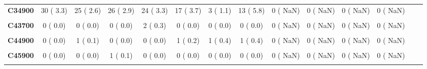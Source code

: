 \documentclass[
]{article}
\begin{document}
\begin{table}[H]
\begin{tabular}[t]{>{\raggedright\arraybackslash}p{5em}ccccccccccccc}
\textbf{C34900} & 30 (  3.3) & 25 (  2.6) & 26 (  2.9) & 24 (  3.3) & 17 (  3.7) & 3 (  1.1) & 13 (  5.8) & 0 (  NaN) & 0 (  NaN) & 0 (  NaN) & 0 (  NaN) &  & \\
\textbf{\cellcolor{gray!10}{C38400}} & \cellcolor{gray!10}{1 (  0.1)} & \cellcolor{gray!10}{0 (  0.0)} & \cellcolor{gray!10}{0 (  0.0)} & \cellcolor{gray!10}{0 (  0.0)} & \cellcolor{gray!10}{0 (  0.0)} & \cellcolor{gray!10}{0 (  0.0)} & \cellcolor{gray!10}{0 (  0.0)} & \cellcolor{gray!10}{0 (  NaN)} & \cellcolor{gray!10}{0 (  NaN)} & \cellcolor{gray!10}{0 (  NaN)} & \cellcolor{gray!10}{0 (  NaN)} & \cellcolor{gray!10}{} & \cellcolor{gray!10}{}\\
\textbf{C43700} & 0 (  0.0) & 0 (  0.0) & 0 (  0.0) & 2 (  0.3) & 0 (  0.0) & 0 (  0.0) & 0 (  0.0) & 0 (  NaN) & 0 (  NaN) & 0 (  NaN) & 0 (  NaN) &  & \\
\textbf{\cellcolor{gray!10}{C43900}} & \cellcolor{gray!10}{2 (  0.2)} & \cellcolor{gray!10}{3 (  0.3)} & \cellcolor{gray!10}{3 (  0.3)} & \cellcolor{gray!10}{1 (  0.1)} & \cellcolor{gray!10}{1 (  0.2)} & \cellcolor{gray!10}{0 (  0.0)} & \cellcolor{gray!10}{3 (  1.3)} & \cellcolor{gray!10}{0 (  NaN)} & \cellcolor{gray!10}{0 (  NaN)} & \cellcolor{gray!10}{0 (  NaN)} & \cellcolor{gray!10}{0 (  NaN)} & \cellcolor{gray!10}{} & \cellcolor{gray!10}{}\\
\textbf{C44900} & 0 (  0.0) & 1 (  0.1) & 0 (  0.0) & 0 (  0.0) & 1 (  0.2) & 1 (  0.4) & 1 (  0.4) & 0 (  NaN) & 0 (  NaN) & 0 (  NaN) & 0 (  NaN) &  & \\
\textbf{\cellcolor{gray!10}{C45000}} & \cellcolor{gray!10}{0 (  0.0)} & \cellcolor{gray!10}{0 (  0.0)} & \cellcolor{gray!10}{1 (  0.1)} & \cellcolor{gray!10}{0 (  0.0)} & \cellcolor{gray!10}{0 (  0.0)} & \cellcolor{gray!10}{0 (  0.0)} & \cellcolor{gray!10}{0 (  0.0)} & \cellcolor{gray!10}{0 (  NaN)} & \cellcolor{gray!10}{0 (  NaN)} & \cellcolor{gray!10}{0 (  NaN)} & \cellcolor{gray!10}{0 (  NaN)} & \cellcolor{gray!10}{} & \cellcolor{gray!10}{}\\
\textbf{C45900} & 0 (  0.0) & 0 (  0.0) & 1 (  0.1) & 0 (  0.0) & 0 (  0.0) & 0 (  0.0) & 0 (  0.0) & 0 (  NaN) & 0 (  NaN) & 0 (  NaN) & 0 (  NaN) &  & \\
\textbf{\cellcolor{gray!10}{C46900}} & \cellcolor{gray!10}{0 (  0.0)} & \cellcolor{gray!10}{1 (  0.1)} & \cellcolor{gray!10}{0 (  0.0)} & \cellcolor{gray!10}{1 (  0.1)} & \cellcolor{gray!10}{0 (  0.0)} & \cellcolor{gray!10}{0 (  0.0)} & \cellcolor{gray!10}{0 (  0.0)} & \cellcolor{gray!10}{0 (  NaN)} & \cellcolor{gray!10}{0 (  NaN)} & \cellcolor{gray!10}{0 (  NaN)} & \cellcolor{gray!10}{0 (  NaN)} & \cellcolor{gray!10}{} & \cellcolor{gray!10}{}\\

\end{tabular}
\end{table}
\end{document}
